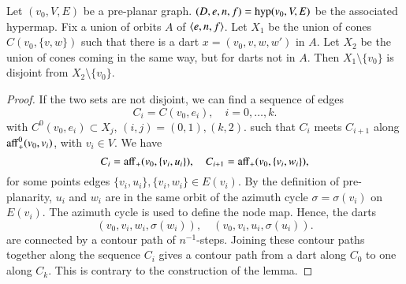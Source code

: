 %

\begin{lemma}  
Let $(v_0,V,E)$ be a pre-planar graph.  
$(D,e,n,f) = {\operatorname{hyp}}(v_0,V,E)$ be the associated hypermap.
Fix a union of orbits $A$ 
of $\langle e,n,f\rangle$.  Let $X_1$ be
the union of cones $C(v_0,{\{v,w\}})$ such that there is a dart 
$x =
(v_0,v,w,w')$ in $A$.  Let $X_2$ be the union of cones coming in the
same way, but for darts not in $A$.  Then $X_1\setminus\{v_0\}$ is disjoint
from $X_2\setminus\{v_0\}$.
\end{lemma}

\begin{proof} 
If the two sets are not disjoint, we can find a sequence of
edges
   $$C_i=C(v_0,e_i),\quad i=0,\ldots,k.$$
with $C^0(v_0,e_i)\subset X_j$, $(i,j)=(0,1),(k,2)$.
such that $C_i$ meets $C_{i+1}$ along ${\operatorname{aff}}_+^0(v_0,v_i)$,
with $v_i\in V$.   We have
$$C_i = {\operatorname{aff}}_+(v_0,\{v_i,u_i\}),
  \quad 
  C_{i+1} = {\operatorname{aff}}_+(v_0,\{v_i,w_i\}),$$
for some points edges $\{v_i,u_i\},\{v_i,w_i\}\in E(v_i)$.
By the definition of pre-planarity, $u_i$ and $w_i$ are
in the same orbit of the azimuth cycle $\sigma=\sigma(v_i)$ on $E(v_i)$.
The azimuth cycle is used to define the node map.
Hence, the darts 
   $$
   (v_0,v_i,w_i,\sigma(w_i)),\quad
   (v_0,v_i,u_i,\sigma(u_i)).
   $$
are connected by a contour path of $n^{-1}$-steps.
Joining these contour paths together along the sequence
$C_i$ gives a contour path from a dart along $C_0$ to
one along $C_k$.  This is contrary to the construction of
the lemma.
\end{proof}




